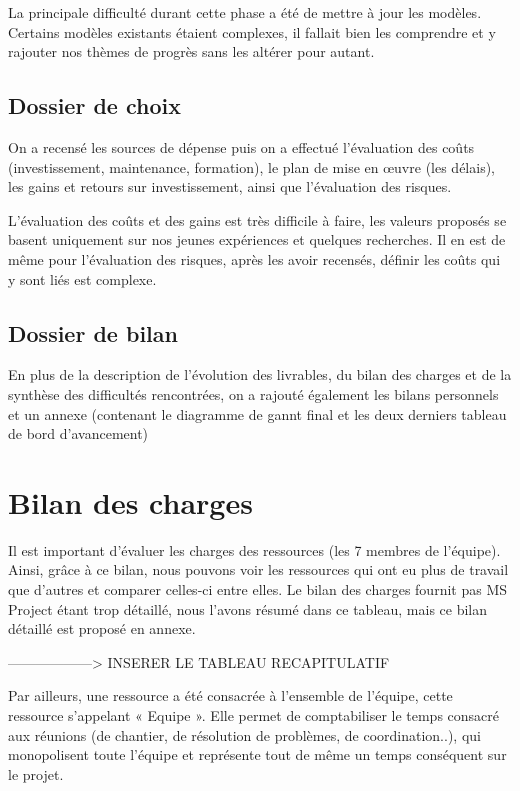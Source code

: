        La principale difficulté durant cette phase a été de mettre à jour les modèles. Certains modèles existants étaient complexes, il fallait bien les comprendre et y rajouter nos thèmes de progrès sans les altérer pour autant.

       \subsection{Dossier de choix}
On a recensé les sources de dépense puis on a effectué l'évaluation des coûts (investissement, maintenance, formation), le plan de mise en œuvre (les délais), les gains et retours sur investissement, ainsi que l'évaluation des risques.

        L'évaluation des coûts et des gains est très difficile à faire, les valeurs proposés se basent uniquement sur nos jeunes expériences et quelques recherches. Il en est de même pour l'évaluation des risques, après les avoir recensés, définir les coûts qui y sont liés est complexe.

       \subsection{Dossier de bilan}
En plus de la description de l'évolution des livrables, du bilan des charges et de la synthèse des difficultés rencontrées, on a rajouté également les bilans personnels et un annexe (contenant le diagramme de gannt final et les deux derniers tableau de bord d'avancement)


\section{Bilan des charges}
Il est important d'évaluer les charges des ressources (les 7 membres de l'équipe). Ainsi, grâce à ce bilan, nous pouvons voir les ressources qui ont eu plus de travail que d'autres et comparer celles-ci entre elles. Le bilan des charges fournit pas MS Project étant trop détaillé, nous l'avons résumé dans ce tableau, mais ce bilan détaillé est proposé en annexe.

------------------> INSERER LE TABLEAU RECAPITULATIF

Par ailleurs, une ressource a été consacrée à l'ensemble de l'équipe, cette ressource s'appelant « Equipe ». Elle permet de comptabiliser le temps consacré aux réunions (de chantier, de résolution de problèmes, de coordination..), qui monopolisent toute l'équipe et représente tout de même un temps conséquent sur le projet.

